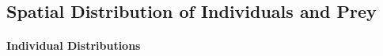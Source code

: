 \documentclass[11pt]{article}
\begin{document}

\subsection*{Spatial Distribution of Individuals and Prey}

\paragraph{Individual Distributions}
\end{document}
